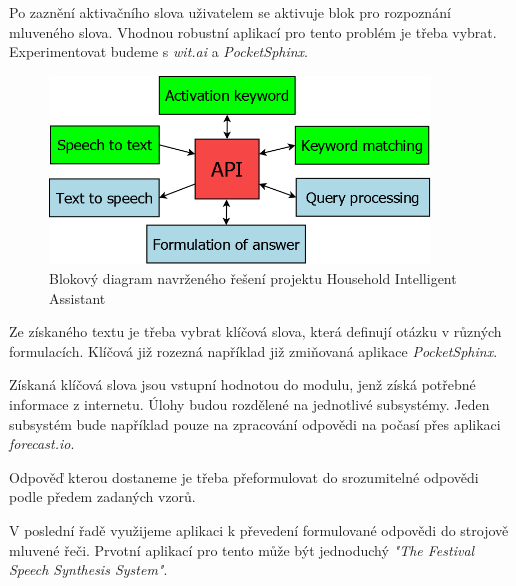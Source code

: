 \documentclass[12pt,a4paper]{article}
\begin{document}
Po zaznění aktivačního slova uživatelem se aktivuje blok pro rozpoznání mluveného slova. Vhodnou robustní aplikací pro tento problém je třeba vybrat. Experimentovat budeme s \textit{wit.ai} a \textit{PocketSphinx}.

\begin{figure}[ht!]
	\begin{center}
	\includegraphics[width = 0.9\textwidth]{Diagram_API.png}
	\caption{Blokový diagram navrženého řešení projektu Household Intelligent Assistant}
	\label{fig:diagram api}
	\end{center}
\end{figure}

Ze získaného textu je třeba vybrat klíčová slova, která definují otázku v různých formulacích. Klíčová již rozezná například již zmiňovaná aplikace \textit{PocketSphinx}.


Získaná klíčová slova jsou vstupní hodnotou do modulu, jenž získá potřebné informace z internetu. Úlohy budou rozdělené na jednotlivé subsystémy. Jeden subsystém bude například pouze na zpracování odpovědi na počasí přes aplikaci \textit{forecast.io}.

Odpověď kterou dostaneme je třeba přeformulovat do srozumitelné odpovědi podle předem zadaných vzorů. 

V poslední řadě využijeme aplikaci k převedení formulované odpovědi do strojově mluvené řeči. Prvotní aplikací pro tento může být jednoduchý \textit{"The Festival Speech Synthesis System"}.

\end{document}
